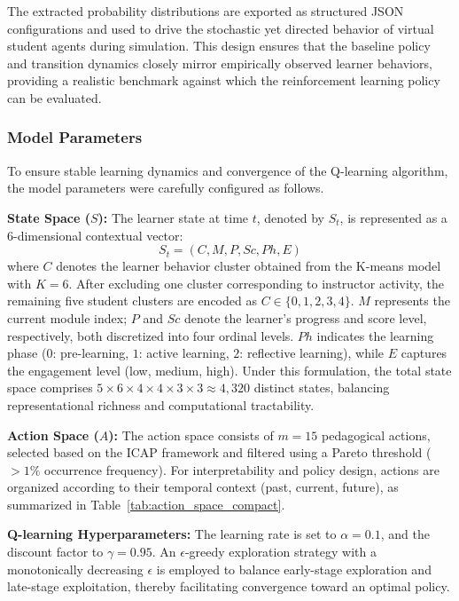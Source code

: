 \documentclass[9pt, conference, a4paper, compsocconf]{IEEEtran}
\begin{document}
The extracted probability distributions are exported as structured JSON configurations and used to drive the stochastic yet directed behavior of virtual student agents during simulation. This design ensures that the baseline policy and transition dynamics closely mirror empirically observed learner behaviors, providing a realistic benchmark against which the reinforcement learning policy can be evaluated.

\subsubsection{Model Parameters}
To ensure stable learning dynamics and convergence of the Q-learning algorithm, the model parameters were carefully configured as follows.

\textbf{State Space ($S$):} The learner state at time $t$, denoted by $S_t$, is represented as a 6-dimensional contextual vector:
\begin{equation}
S_t = (C, M, P, Sc, Ph, E)
\end{equation}
where $C$ denotes the learner behavior cluster obtained from the K-means model with $K=6$. After excluding one cluster corresponding to instructor activity, the remaining five student clusters are encoded as $C \in \{0,1,2,3,4\}$.  
$M$ represents the current module index; $P$ and $Sc$ denote the learner's progress and score level, respectively, both discretized into four ordinal levels.  
$Ph$ indicates the learning phase ($0$: pre-learning, $1$: active learning, $2$: reflective learning), while $E$ captures the engagement level (low, medium, high).  
Under this formulation, the total state space comprises $5 \times 6 \times 4 \times 4 \times 3 \times 3 \approx 4{,}320$ distinct states, balancing representational richness and computational tractability.

\textbf{Action Space ($A$):} The action space consists of $m=15$ pedagogical actions, selected based on the ICAP framework and filtered using a Pareto threshold ($>1\%$ occurrence frequency). For interpretability and policy design, actions are organized according to their temporal context (past, current, future), as summarized in Table~\ref{tab:action_space_compact}.

\textbf{Q-learning Hyperparameters:} The learning rate is set to $\alpha = 0.1$, and the discount factor to $\gamma = 0.95$. An $\epsilon$-greedy exploration strategy with a monotonically decreasing $\epsilon$ is employed to balance early-stage exploration and late-stage exploitation, thereby facilitating convergence toward an optimal policy.
\end{document}
